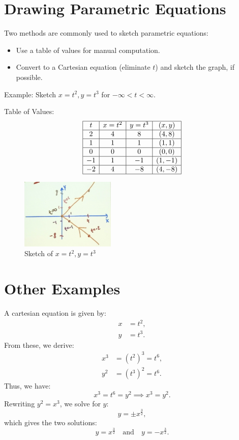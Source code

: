 \documentclass[12pt]{article}
\begin{document}
\section*{Drawing Parametric Equations}
Two methods are commonly used to sketch parametric equations:
\begin{itemize}
    \item Use a table of values for manual computation.
    \item Convert to a Cartesian equation (eliminate \( t \)) and sketch the graph, if possible.
\end{itemize}

Example:
Sketch \( x = t^2, y = t^3 \) for \( -\infty < t < \infty \).

Table of Values:
\[
\begin{array}{|c|c|c|c|}
\hline
t & x = t^2 & y = t^3 & (x, y) \\ \hline
2 & 4 & 8 & (4, 8) \\ \hline
1 & 1 & 1 & (1, 1) \\ \hline
0 & 0 & 0 & (0, 0) \\ \hline
-1 & 1 & -1 & (1, -1) \\ \hline
-2 & 4 & -8 & (4, -8) \\ \hline
\end{array}
\]

\begin{figure}[h!]
\centering
\includegraphics[width=0.4\textwidth]{sketching_example1.jpg}
\caption{Sketch of \( x = t^2, y = t^3 \)}
\label{fig:sketch_example1}
\end{figure}

\section*{Other Examples}
A cartesian equation is given by:  
\[
\begin{aligned}
x &= t^2, \\
y &= t^3.
\end{aligned}
\]
From these, we derive:  
\[
\begin{aligned}
x^3 &= (t^2)^3 = t^6, \\
y^2 &= (t^3)^2 = t^6.
\end{aligned}
\]
Thus, we have:
\[
x^3 = t^6 = y^2 \implies x^3 = y^2.
\]
Rewriting \( y^2 = x^3 \), we solve for \( y \):
\[
y = \pm x^{\frac{3}{2}},
\]
which gives the two solutions:
\[
y = x^{\frac{3}{2}} \quad \text{and} \quad y = -x^{\frac{3}{2}}.
\]
\end{document}
